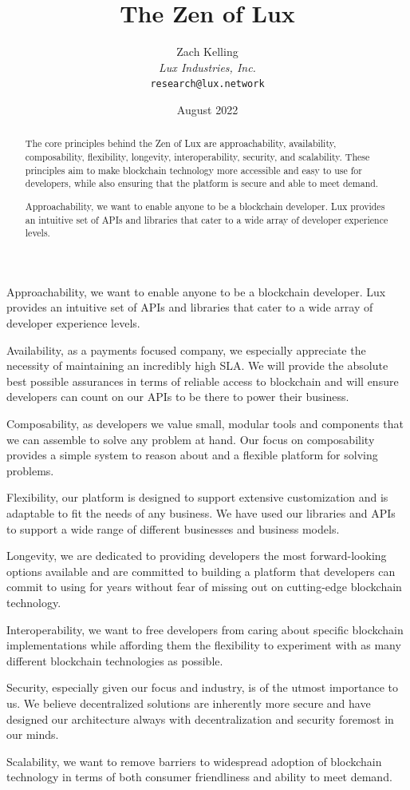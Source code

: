 \documentclass[11pt]{article}
\title{The Zen of Lux}
\author{Zach Kelling\\\textit{Lux Industries, Inc.}\\\texttt{research@lux.network}}
\date{August 2022}
\begin{document}
\luxcoverpage

\begin{abstract}
The core principles behind the Zen of Lux are approachability, availability, composability, flexibility, longevity, interoperability, security, and scalability. These principles aim to make blockchain technology more accessible and easy to use for developers, while also ensuring that the platform is secure and able to meet demand.

Approachability, we want to enable anyone to be a blockchain developer. Lux provides an intuitive set of APIs and libraries that cater to a wide array of developer experience levels.
\end{abstract}

\tableofcontents
\newpage


Approachability, we want to enable anyone to be a blockchain developer. Lux provides an intuitive set of APIs and libraries that cater to a wide array of developer experience levels.


Availability, as a payments focused company, we especially appreciate the necessity of maintaining an incredibly high SLA. We will provide the absolute best possible assurances in terms of reliable access to blockchain and will ensure developers can count on our APIs to be there to power their business.


Composability, as developers we value small, modular tools and components that we can assemble to solve any problem at hand. Our focus on composability provides a simple system to reason about and a flexible platform for solving problems.


Flexibility, our platform is designed to support extensive customization and is adaptable to fit the needs of any business. We have used our libraries and APIs to support a wide range of different businesses and business models.


Longevity, we are dedicated to providing developers the most forward-looking options available and are committed to building a platform that developers can commit to using for years without fear of missing out on cutting-edge blockchain technology.


Interoperability, we want to free developers from caring about specific blockchain implementations while affording them the flexibility to experiment with as many different blockchain technologies as possible.


Security, especially given our focus and industry, is of the utmost importance to us. We believe decentralized solutions are inherently more secure and have designed our architecture always with decentralization and security foremost in our minds.


Scalability, we want to remove barriers to widespread adoption of blockchain technology in terms of both consumer friendliness and ability to meet demand.
\end{document}
